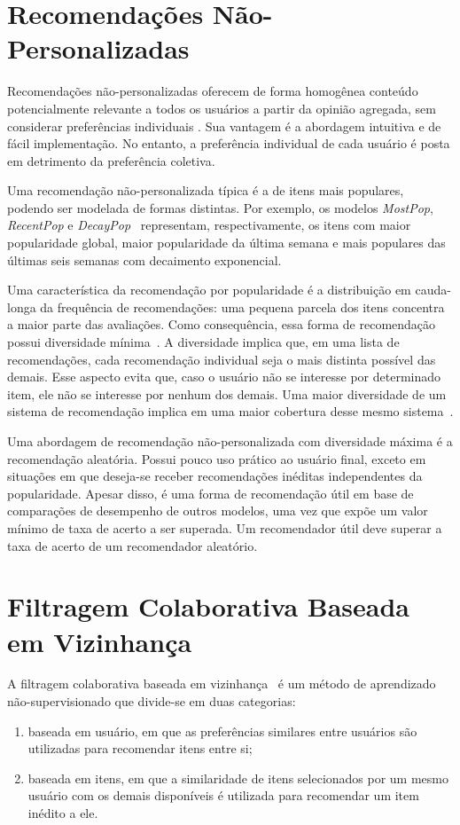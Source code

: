 \section{Recomendações Não-Personalizadas}
Recomendações não-personalizadas oferecem de forma homogênea conteúdo
potencialmente relevante a todos os usuários a partir da opinião agregada, sem
considerar preferências individuais \cite{poriya2014non}. Sua vantagem é a
abordagem intuitiva e de fácil implementação. No entanto, a preferência
individual de cada usuário é posta em detrimento da preferência coletiva.

Uma recomendação não-personalizada típica é a de itens mais populares, podendo
ser modelada de formas distintas. Por exemplo, os modelos \textit{MostPop},
\textit{RecentPop} e \textit{DecayPop}~\cite{ji2020re, jing2023capturing}
representam, respectivamente, os itens com maior popularidade global, maior
popularidade da última semana e mais populares das últimas seis semanas com
decaimento exponencial.

Uma característica da recomendação por popularidade é a distribuição em
cauda-longa da frequência de recomendações: uma pequena parcela dos itens
concentra a maior parte das avaliações. Como consequência, essa forma de
recomendação possui diversidade mínima~\cite{aggarwal2016recommender}. A
diversidade implica que, em uma lista de recomendações, cada recomendação
individual seja o mais distinta possível das demais. Esse aspecto evita que,
caso o usuário não se interesse por determinado item, ele não se interesse por
nenhum dos demais. Uma maior diversidade de um sistema de recomendação implica
em uma maior cobertura desse mesmo sistema~\cite{aggarwal2016recommender}.

Uma abordagem de recomendação não-personalizada com diversidade máxima é a
recomendação aleatória. Possui pouco uso prático ao usuário final, exceto em
situações em que deseja-se receber recomendações inéditas independentes da
popularidade. Apesar disso, é uma forma de recomendação útil em base de
comparações de desempenho de outros modelos, uma vez que expõe um valor mínimo
de taxa de acerto a ser superada. Um recomendador útil deve superar a taxa de
acerto de um recomendador aleatório.

\section{Filtragem Colaborativa Baseada em Vizinhança} A filtragem
colaborativa baseada em vizinhança~\cite{aggarwal2016recommender} é um método de aprendizado não-supervisionado
que divide-se em duas categorias:
\begin{enumerate}
    \item baseada em usuário, em
que as preferências similares entre usuários são utilizadas para recomendar
itens entre si;
    \item baseada em itens, em que a similaridade de itens selecionados
por um mesmo usuário com os demais disponíveis é utilizada para recomendar um
item inédito a ele.
\end{enumerate}

